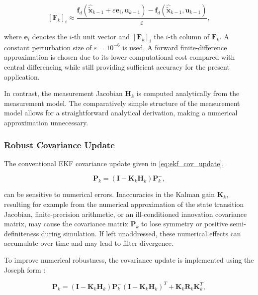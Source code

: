 \begin{equation}
	\left[\bm{F}_k\right]_{i}
	\approx
	\frac{
		\bm{f}_d\!\left(\hat{\tilde{\bm{x}}}_{k-1} + \varepsilon \bm{e}_i,\bm{u}_{k-1}\right)
		-
		\bm{f}_d\!\left(\hat{\tilde{\bm{x}}}_{k-1},\bm{u}_{k-1}\right)
	}{\varepsilon},
\end{equation}

where $\bm{e}_i$ denotes the $i$-th unit vector and $\left[\bm{F}_k\right]_{i}$ the $i$-th column of $\bm{F}_k$. A constant perturbation size of $\varepsilon = 10^{-6}$ is used. A forward finite-difference approximation is chosen due to its lower computational cost compared with central differencing while still providing sufficient accuracy for the present application.

In contrast, the measurement Jacobian $\bm{H}_k$ is computed analytically from the measurement model. The comparatively simple structure of the measurement model allows for a straightforward analytical derivation, making a numerical approximation unnecessary.





\subsubsection{Robust Covariance Update}

The conventional EKF covariance update given in \eqref{eq:ekf_cov_update},

\begin{equation}
	\bm{P}_k
	=
	\left(\bm{I} - \bm{K}_k\bm{H}_k\right)
	\bm{P}_k^-,
\end{equation}

can be sensitive to numerical errors. Inaccuracies in the Kalman gain $\bm{K}_k$, resulting for example from the numerical approximation of the state transition Jacobian, finite-precision arithmetic, or an ill-conditioned innovation covariance matrix, may cause the covariance matrix $\bm{P}_k$ to lose symmetry or positive semi-definiteness during simulation. If left unaddressed, these numerical effects can accumulate over time and may lead to filter divergence.

To improve numerical robustness, the covariance update is implemented using the Joseph form \cite{Simon2006KF}:

\begin{equation}
	\bm{P}_k
	=
	\left(\bm{I} - \bm{K}_k\bm{H}_k\right)
	\bm{P}_k^-
	\left(\bm{I} - \bm{K}_k\bm{H}_k\right)^T
	+
	\bm{K}_k \bm{R}_k \bm{K}_k^T,
\end{equation}

